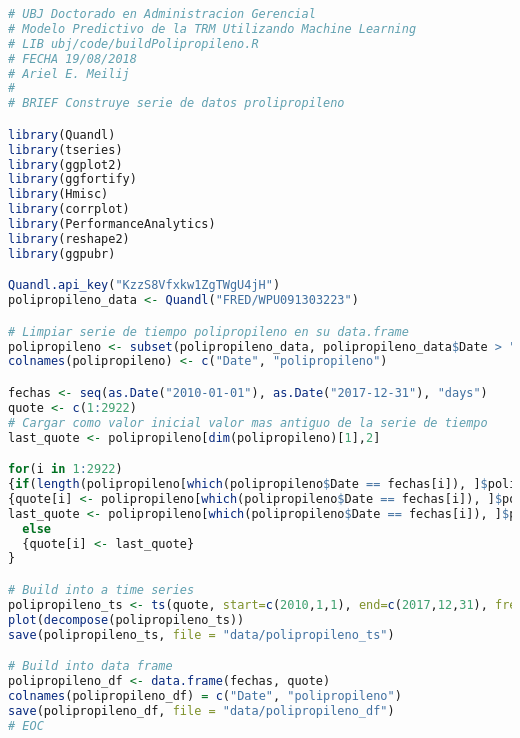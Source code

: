\begin{lstlisting}[language=R]
# UBJ Doctorado en Administracion Gerencial
# Modelo Predictivo de la TRM Utilizando Machine Learning
# LIB ubj/code/buildPolipropileno.R 
# FECHA 19/08/2018
# Ariel E. Meilij
#
# BRIEF Construye serie de datos prolipropileno

library(Quandl)
library(tseries)
library(ggplot2)
library(ggfortify)
library(Hmisc)
library(corrplot)
library(PerformanceAnalytics)
library(reshape2)
library(ggpubr)

Quandl.api_key("KzzS8Vfxkw1ZgTWgU4jH")
polipropileno_data <- Quandl("FRED/WPU091303223")

# Limpiar serie de tiempo polipropileno en su data.frame
polipropileno <- subset(polipropileno_data, polipropileno_data$Date > "2009-12-31")
colnames(polipropileno) <- c("Date", "polipropileno")

fechas <- seq(as.Date("2010-01-01"), as.Date("2017-12-31"), "days")
quote <- c(1:2922)
# Cargar como valor inicial valor mas antiguo de la serie de tiempo
last_quote <- polipropileno[dim(polipropileno)[1],2]

for(i in 1:2922)
{if(length(polipropileno[which(polipropileno$Date == fechas[i]), ]$polipropileno))
{quote[i] <- polipropileno[which(polipropileno$Date == fechas[i]), ]$polipropileno
last_quote <- polipropileno[which(polipropileno$Date == fechas[i]), ]$polipropileno}
  else
  {quote[i] <- last_quote}
}

# Build into a time series
polipropileno_ts <- ts(quote, start=c(2010,1,1), end=c(2017,12,31), frequency=365)
plot(decompose(polipropileno_ts))
save(polipropileno_ts, file = "data/polipropileno_ts")

# Build into data frame
polipropileno_df <- data.frame(fechas, quote)
colnames(polipropileno_df) = c("Date", "polipropileno")
save(polipropileno_df, file = "data/polipropileno_df")
# EOC
\end{lstlisting}


